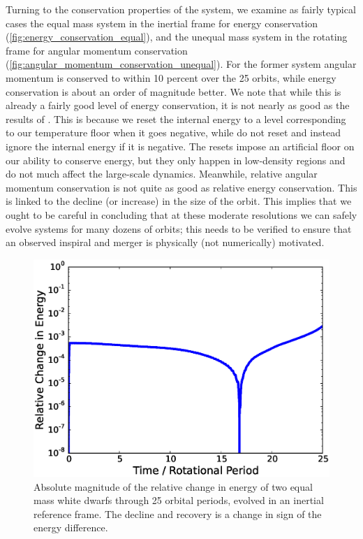 \documentclass[12pt]{article}
\begin{document}
Turning to the conservation properties of the system, we examine as
fairly typical cases the equal mass system in the inertial frame for
energy conservation (\autoref{fig:energy_conservation_equal}), and the
unequal mass system in the rotating frame for angular momentum
conservation (\autoref{fig:angular_momentum_conservation_unequal}).
For the former system angular momentum is conserved to within 10 percent over the 25
orbits, while energy conservation is about an order of magnitude
better. We note that while this is already a fairly good level of
energy conservation, it is not nearly as good as the results of
\citet{marcello:2012}. This is because we reset the internal energy to
a level corresponding to our temperature floor when it goes negative,
while \citeauthor{marcello:2012} do not reset and instead ignore the
internal energy if it is negative. The resets impose an artificial
floor on our ability to conserve energy, but they only happen in
low-density regions and do not much affect the large-scale dynamics.
Meanwhile, relative angular momentum conservation is not quite as good 
as relative energy conservation.  This is 
linked to the decline (or increase) in the size of the orbit. This
implies that we ought to be careful in concluding that at these
moderate resolutions we can safely evolve systems for many dozens of
orbits; this needs to be verified to ensure that an observed inspiral
and merger is physically (not numerically) motivated.

\begin{figure}[h!]
  \centering
  \includegraphics[scale=0.8,trim=0.1in 0.0in 0.1in 0.1in,clip]{plots/equal_energy_rot0}
  \caption[System energy over 25 orbital periods]
          {Absolute magnitude of the relative change in energy of two equal mass white dwarfs through 25 orbital periods,
           evolved in an inertial reference frame. The decline and recovery is a change in sign of the energy difference.
           \label{fig:energy_conservation_equal}}
\end{figure}
\end{document}
